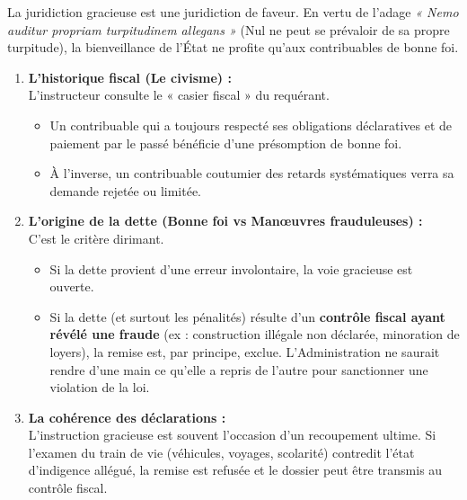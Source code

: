 \documentclass[Cours_contentieuxTF2026.tex]{subfiles}
\begin{document}
 La juridiction gracieuse est une juridiction de faveur. En vertu de l'adage \textit{« Nemo auditur propriam turpitudinem allegans »} (Nul ne peut se prévaloir de sa propre turpitude), la bienveillance de l'État ne profite qu'aux contribuables de bonne foi.
 
 \begin{enumerate}
 	\item \textbf{L'historique fiscal (Le civisme) :} \\
 	L'instructeur consulte le « casier fiscal » du requérant.
 	\begin{itemize}
 		\item Un contribuable qui a toujours respecté ses obligations déclaratives et de paiement par le passé bénéficie d'une présomption de bonne foi.
 		\item À l'inverse, un contribuable coutumier des retards systématiques verra sa demande rejetée ou limitée.
 	\end{itemize}
 	
 	\item \textbf{L'origine de la dette (Bonne foi vs Manœuvres frauduleuses) :} \\
 	C'est le critère dirimant.
 	\begin{itemize}
 		\item Si la dette provient d'une erreur involontaire, la voie gracieuse est ouverte.
 		\item Si la dette (et surtout les pénalités) résulte d'un \textbf{contrôle fiscal ayant révélé une fraude} (ex : construction illégale non déclarée, minoration de loyers), la remise est, par principe, exclue. L'Administration ne saurait rendre d'une main ce qu'elle a repris de l'autre pour sanctionner une violation de la loi.
 	\end{itemize}
 	
 	\item \textbf{La cohérence des déclarations :} \\
 	L'instruction gracieuse est souvent l'occasion d'un recoupement ultime. Si l'examen du train de vie (véhicules, voyages, scolarité) contredit l'état d'indigence allégué, la remise est refusée et le dossier peut être transmis au contrôle fiscal.
 \end{enumerate}
 
 \vspace{0.5cm}
 
 \begin{center}
 \end{center}
 
\end{document}
